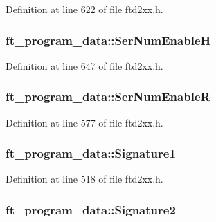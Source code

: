 Definition at line 622 of file ftd2xx.h.\hypertarget{structft__program__data_aff965810e81cec5c72164c76dfd9a1fb}{
\subsubsection[{SerNumEnableH}]{ {\bf ft\_\-program\_\-data::SerNumEnableH}}}
\label{structft__program__data_aff965810e81cec5c72164c76dfd9a1fb}


Definition at line 647 of file ftd2xx.h.\hypertarget{structft__program__data_ae793566abd42704cd6bdf04b77c84f73}{
\subsubsection[{SerNumEnableR}]{ {\bf ft\_\-program\_\-data::SerNumEnableR}}}
\label{structft__program__data_ae793566abd42704cd6bdf04b77c84f73}


Definition at line 577 of file ftd2xx.h.\hypertarget{structft__program__data_a6b26e04c691ec5944d2fffec797c399a}{
\subsubsection[{Signature1}]{ {\bf ft\_\-program\_\-data::Signature1}}}
\label{structft__program__data_a6b26e04c691ec5944d2fffec797c399a}


Definition at line 518 of file ftd2xx.h.\hypertarget{structft__program__data_ab28a0f4509093050f1927f1e946f3d9f}{
\subsubsection[{Signature2}]{ {\bf ft\_\-program\_\-data::Signature2}}}
\label{structft__program__data_ab28a0f4509093050f1927f1e946f3d9f}


